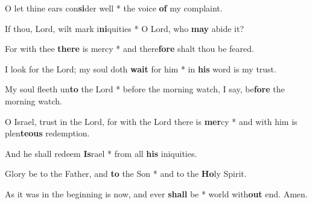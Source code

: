 \begin{multicols}{2}
	O let thine ears con\textbf{si}der well * the voice \textbf{of} my complaint.
	
	If thou, Lord, wilt mark i\textbf{ni}quities * O Lord, who \textbf{may} abide it?
	
	For with thee \textbf{there} is mercy  * and there\textbf{fore} shalt thou be feared.
	
	I look for the Lord; my soul doth \textbf{wait} for him * in \textbf{his} word is my trust.
	
	My soul fleeth un\textbf{to} the Lord * before the morning watch, I say, be\textbf{fore} the morning watch.
	
	O Israel, trust in the Lord, for with the Lord there is \textbf{mer}cy * and with him is plen\textbf{teous} redemption.
	
	And he shall redeem \textbf{Is}rael * from all \textbf{his} iniquities.
	
	Glory be to the Father, and \textbf{to} the Son * and to the \textbf{Ho}ly Spirit.
	
	As it was in the beginning is now, and ever \textbf{shall} be * world with\textbf{out} end. Amen.
\end{multicols}